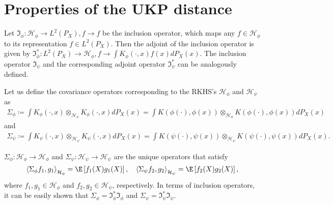\documentclass{article} %
\newcommand{\I}{\mathfrak{I}}
\newcommand{\Hil}{\mathcal{H}}
\newcommand{\repone}{\phi}
\newcommand{\reptwo}{\psi}
\newcommand{\Hone}{\mathcal{H}_{\phi}}
\newcommand{\Htwo}{\mathcal{H}_{\psi}}
\newcommand{\norm}[1]{\left\|#1\right\|}
\newcommand{\inprod}[1]{\left \langle #1 \right\rangle}
\newcommand{\LPtwo}{L^{2}(P_{X})}
\newcommand{\metricstname}{UKP }
\newcommand{\metricfullname}{Uniform Kernel Prober}
\theoremstyle{plain}
\newcounter{definitionno}
\newtheorem{definition}[definitionno]{Definition}
\begin{document}

\section{Properties of the \metricstname distance} \label{Properties}

Let $\I_{\repone}: \Hone \to \LPtwo, f \to f$ be the inclusion operator, which maps any $f \in \Hone$ to its representation $f \in \LPtwo$. Then the adjoint of the inclusion operator is given by $\I_{\repone}^{*}:\LPtwo \to \Hone, f \to \int K_{\repone}(\cdot,x)f(x)dP_{X}(x)$. The inclusion operator $\I_{\reptwo}$ and the corresponding adjoint operator $\I_{\reptwo}^{*}$ can be analogously defined. 

Let us define the covariance operators corresponding to the RKHS's $\Hone$ and $\Htwo$ as
\[
\begin{aligned}
    \Sigma_{\repone} \coloneq \int K_{\repone}(\cdot,x) \otimes_{\Hone}  K_{\repone}(\cdot,x) dP_{X}(x)= \int K(\repone(\cdot),\repone(x)) \otimes_{\Hone} K(\repone(\cdot),\repone(x)) dP_{X}(x)
\end{aligned}
\]
and 
\[
\begin{aligned}
    \Sigma_{\reptwo} \coloneq \int K_{\reptwo}(\cdot,x) \otimes_{\Htwo}  K_{\reptwo}(\cdot,x) dP_{X}(x)= \int K(\reptwo(\cdot),\reptwo(x)) \otimes_{\Htwo} K(\reptwo(\cdot),\reptwo(x)) dP_{X}(x).
\end{aligned}
\]

$\Sigma_{\repone}: \Hil_{\repone} \to \Hil_{\repone}$ and $\Sigma_{\reptwo}: \Hil_{\reptwo} \to \Hil_{\reptwo}$ are the unique operators that satisfy 
\[
    \inprod{\Sigma_{\repone}f_{1},g_{1}}_{\Hone} = \E\left[f_{1}(X)g_{1}(X)\right], \quad
    \inprod{\Sigma_{\reptwo}f_{2},g_{2}}_{\Htwo} = \E\left[f_{2}(X)g_{2}(X)\right],
\]
where $f_{1},g_{1} \in \Hone$ and $f_{2},g_{2} \in \Htwo$, respectively. In terms of inclusion operators, it can be easily shown that $\Sigma_{\repone} = \I_{\repone}^{*}\I_{\repone}$ and $\Sigma_{\reptwo} = \I_{\reptwo}^{*}\I_{\reptwo}$.
\end{document}
